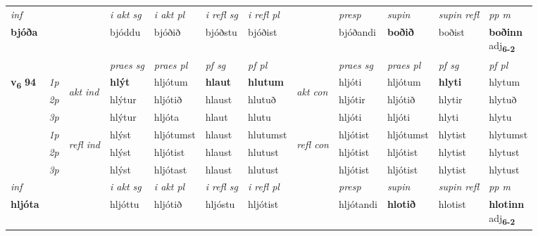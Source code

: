 \begin{longtable}[l]{X>{\footnotesize\itshape}llXXXXlXXXX}
\cmidrule{4-7}
   {\textit{inf}} & &  & \textit{i akt sg} & \textit{i akt pl} & \textit{i refl sg} & \textit{i refl pl} && \textit{presp} & \textit{supin} & \textit{supin refl} & \textit{pp m} \\*
  {\textbf{bjóða}} & && bjóddu  & bjóðið & bjóðstu & bjóðist && bjóðandi &  \textbf{boðið} & boðist & \specialcell{\textbf{boðinn} \\ adj\textbf{\textsubscript{6-2}}} \\*

\midrule

 & &   & \textit{praes sg}  & \textit{praes pl}    & \textit{ pf sg} & \textit{pf pl} & & \textit{praes sg}  & \textit{praes pl}    & \textit{pf sg} & \textit{pf pl }  \\ \cmidrule{4-7} \cmidrule{9-12}
 \multirow{2}{*}{{{\textbf{v{\textsubscript{6}}} \Large{\textbf{94}}}}}  & 1p & \multirow{3}{*}{\begin{turn}{90}\textit{akt ind}\end{turn}} & \textbf{hlýt} & hljótum & \textbf{hlaut} & \textbf{hlutum} & \multirow{3}{*}{\begin{turn}{90}\textit{akt con}\end{turn}} &hljóti & hljótum & \textbf{hlyti} & hlytum\\*
 & 2p &  &  hlýtur  & hljótið & hlaust & hlutuð & & hljótir & hljótið & hlytir & hlytuð \\*
 & 3p &  & hlýtur & hljóta & hlaut & hlutu & & hljóti & hljóti& hlyti & hlytu \\*
\cmidrule{4-7} \cmidrule{9-12}
 & 1p & \multirow{3}{*}{\begin{turn}{90}\textit{refl ind}\end{turn}}  & hlýst & hljótumst & hlaust & hlutumst & \multirow{3}{*}{\begin{turn}{90}\textit{refl con}\end{turn}}  &hljótist & hljótumst & hlytist & hlytumst \\*
 & 2p &  & hlýst & hljótist & hlaust & hlutust & &hljótist & hljótist & hlytist & hlytust \\*
 & 3p  & & hlýst & hljótast & hlaust & hlutust & & hljótist & hljótist& hlytist & hlytust \\*
\cmidrule{4-7} \cmidrule{9-12}

   {\textit{inf}} & &  & \textit{i akt sg} & \textit{i akt pl} & \textit{i refl sg} & \textit{i refl pl} && \textit{presp} & \textit{supin} & \textit{supin refl} & \textit{pp m} \\*
  {\textbf{hljóta}} & && hljóttu  & hljótið & hljóstu & hljótist && hljótandi &  \textbf{hlotið} & hlotist & \specialcell{\textbf{hlotinn} \\ adj\textbf{\textsubscript{6-2}}} \\*


\end{longtable}
